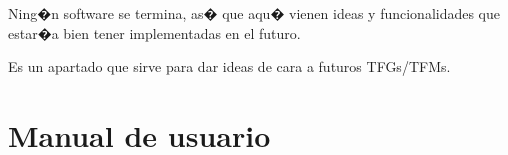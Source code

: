 \documentclass[a4paper, 12pt]{book}
\begin{document}
Ning�n software se termina, as� que aqu� vienen ideas y funcionalidades que estar�a bien tener implementadas en el futuro.

Es un apartado que sirve para dar ideas de cara a futuros TFGs/TFMs.



\cleardoublepage
\appendix
\chapter{Manual de usuario}
\label{app:manual}



\cleardoublepage


\end{document}
